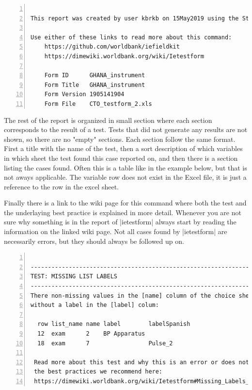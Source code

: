 \documentclass{tufte-handout}
\begin{document}
	\begin{minipage}{1.5\textwidth}
		\vspace{.5cm}
	 	\begin{Verbatim}[frame=lines,
						numbers=left,
						label=ietestform-header,
						samepage=true,
						baselinestretch=0.75]

This report was created by user kbrkb on 15May2019 using the Stata command ietestform

Use either of these links to read more about this command:
	https://github.com/worldbank/iefieldkit
	https://dimewiki.worldbank.org/wiki/Ietestform

	Form ID      GHANA_instrument
	Form Title   GHANA_instrument
	Form Version 1905141904
	Form File    CTO_testform_2.xls
		\end{Verbatim}
		\vspace{.5cm}
 	\end{minipage}
 
	\noindent The rest of the report is organized in small section where each section corresponds to the result of a test. Tests that did not generate any results are not shown, so there are no "empty" sections. Each section follow the same format. First a title with the name of the test, then a sort description of which variables in which sheet the test found this case reported on, and then there is a section listing the cases found. Often this is a table like in the example below, but that is not aways applicable. The variable row does not exist in the Excel file, it is just a reference to the row in the excel sheet.
	
	Finally there is a link to the wiki page for this command where both the test and the underlaying best practice is explained in more detail. Whenever you are not sure why something is in the report of |ietestform| always start by reading the information on the linked wiki page. Not all cases found by |ietestform| are necessarily errors, but they should always be followed up on.
 	
	\begin{minipage}{1.5\textwidth}
	 	\vspace{.5cm}
	 	\begin{Verbatim}[frame=lines,
	 					numbers=left,
	 					label=ietestform-test-section-example,
	 					samepage=true,
	 					baselinestretch=0.75]
	 	
----------------------------------------------------------------------
TEST: MISSING LIST LABELS
----------------------------------------------------------------------
There non-missing values in the [name] column of the choice sheet 
without a label in the [label] colum:
 
  row list_name name label        labelSpanish 
  12  exam      2    BP Apparatus 
  18  exam      7                 Pulse_2
 
 Read more about this test and why this is an error or does not follow 
 the best practices we recommend here:
 https://dimewiki.worldbank.org/wiki/Ietestform#Missing_Labels_or_Value.2FName_in_Choice_Lists

		\end{Verbatim}
		\vspace{.3cm}
	\end{minipage}
\end{document}
